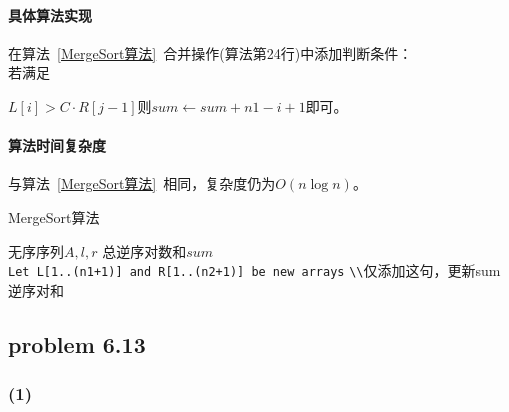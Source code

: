 \documentclass[11pt]{ctexart}
\begin{document}
	\paragraph{具体算法实现}
	在算法~\ref{MergeSort算法}\ 合并操作(算法第24行)中添加判断条件：\\
	若满足{$L[i]>C\cdot R[j-1]$则$sum\gets sum+n1-i+1$即可。
	\paragraph{算法时间复杂度}与算法~\ref{MergeSort算法}\ 相同，复杂度仍为$O(n\log n)$。
	\begin{algorithm}
		\caption{MergeSort算法}
		\label{MergeSort算法}
		\begin{algorithmic}[1]
			\Require 无序序列$A,l,r$
			\Ensure  总逆序对数和$sum$
			\EndFunction
			\\
			\verb|Let L[1..(n1+1)] and R[1..(n2+1)] be new arrays|
			\EndFor
			\EndFor
				\Else
				\verb|\\|仅添加这句，更新sum逆序对和
				\EndIf
			\EndFor
			\EndFunction
		\end{algorithmic}
	\end{algorithm}
	\newpage
	\subsection*{problem 6.13}
	\subsubsection*{(1)}
}
\end{document}
